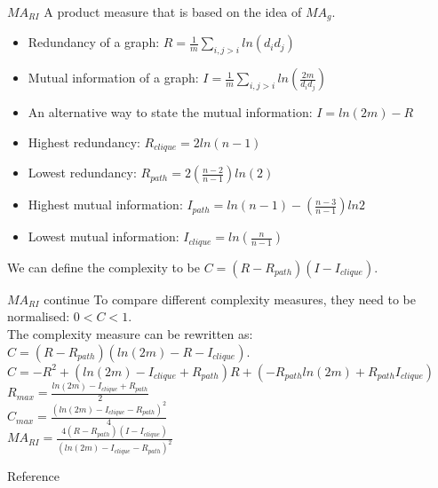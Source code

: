 \documentclass{beamer}
\begin{document}
    \begin{frame}{$MA_{RI}$}
        A product measure that is based on the idea of $MA_g$.
        \begin{itemize}
            \item Redundancy of a graph: $R=\frac{1}{m}\sum_{i,j>i}ln(d_id_j)$
            \item Mutual information of a graph: $I=\frac{1}{m}\sum_{i,j>i}ln(\frac{2m}{d_id_j})$
            \item An alternative way to state the mutual information: $I=ln(2m)-R$
            \item Highest redundancy: $R_{clique} = 2ln(n-1)$
            \item Lowest redundancy: $R_{path} = 2(\frac{n-2}{n-1})ln(2)$
            \item Highest mutual information: $I_{path} = ln(n-1)-(\frac{n-3}{n-1})ln2$
            \item Lowest mutual information: $I_{clique}=ln(\frac{n}{n-1})$
        \end{itemize}
        We can define the complexity to be $C = (R - R_{path})(I-I_{clique})$. 
    \end{frame}

    \begin{frame}{$MA_{RI}$ continue}
        To compare different complexity measures, they need to be normalised: $0<C<1$.\\
        The complexity measure can be rewritten as: $C=(R-R_{path})(ln(2m)-R-I_{clique})$.\\
        \vspace{5mm}
        \centering
        $C = -R^2+(ln(2m)-I_{clique}+R_{path})R+(-R_{path}ln(2m)+R_{path}I_{clique})$
    \\
        \vspace{5mm}
        $R_{max} = \frac{ln(2m)-I_{clique}+R_{path}}{2}$\\
        \vspace{5mm}
        $C_{max} = \frac{(ln(2m)-I_{clique}-R_{path})^2}{4}$\\
        \vspace{5mm}
        $MA_{RI} = \frac{4(R-R_{path})(I-I_{clique})}{(ln(2m)-I_{clique}-R_{path})^2}$
    \end{frame}


    \begin{frame}{Reference}
    \end{frame}
\end{document}
